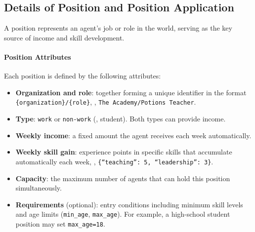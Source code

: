 \subsection{Details of Position and Position Application}
\label{sec:appendix_enrollment}

A position represents an agent's job or role in the world, serving as the key source of income and skill development.

\paragraph{Position Attributes}
Each position is defined by the following attributes:
\begin{itemize}[nosep]
\item \textbf{Organization and role}: together forming a unique identifier in the format \texttt{\{organization\}/\{role\}}, \eg, \texttt{The Academy/Potions Teacher}.
\item \textbf{Type}: \texttt{work} or \texttt{non-work} (\eg, student). Both types can provide income.
\item \textbf{Weekly income}: a fixed amount the agent receives each week automatically.
\item \textbf{Weekly skill gain}: experience points in specific skills that accumulate automatically each week, \eg, \texttt{\{``teaching'': 5, ``leadership'': 3\}}.
\item \textbf{Capacity}: the maximum number of agents that can hold this position simultaneously.
\item \textbf{Requirements} (optional): entry conditions including minimum skill levels and age limits (\texttt{min\_age}, \texttt{max\_age}). For example, a high-school student position may set \texttt{max\_age=18}.
\end{itemize}

